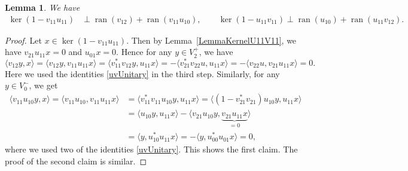 \documentclass[10pt,a4paper]{amsart}
\numberwithin{equation}{section}
\newtheorem{Lemma}[Theorem]{Lemma}
\DeclareMathOperator*{\ran}{ran}
\begin{document}
\begin{Lemma} \label{LemmaComplementOfRange}
 We have
 \begin{align*}
 \ker(1 - v_{11} u_{11}) &\perp \ran(v_{12}) + \ran(v_{11} u_{10}),\qquad \ker(1 - u_{11} v_{11}) \perp \ran (u_{10}) + \ran (u_{11} v_{12}).
 \end{align*}
\end{Lemma}

\begin{proof}
Let $x \in \ker(1-v_{11} u_{11})$. Then by Lemma~\ref{LemmaKernelU11V11}, we have $v_{21} u_{11} x = 0$ and $u_{01} x= 0$. Hence for any $y \in V_2^+$, we have
\begin{equation*}
 \langle v_{12} y, x \rangle = \langle v_{12} y, v_{11} u_{11} x \rangle = \langle v_{11}^* v_{12} y, u_{11} x \rangle = - \langle v_{21}^* v_{22} u, u_{11} x\rangle = -\langle v_{22} u, v_{21} u_{11} x\rangle = 0.
\end{equation*}
Here we used the identities \eqref{uvUnitary} in the third step. Similarly, for any $y \in V_0^-$, we get
\begin{align*}
 \langle v_{11} u_{10} y, x\rangle = \langle v_{11} u_{10}, v_{11} u_{11} x\rangle &= \langle v_{11}^* v_{11} u_{10} y, u_{11} x \rangle = \langle (1- v_{21}^* v_{21}) u_{10} y, u_{11} x\rangle \\
 &= \langle u_{10} y, u_{11} x \rangle - \langle v_{21} u_{10} y, \underbrace{v_{21} u_{11} x}_{=0} \rangle\\
 &= \langle y, u_{10}^*u_{11} x \rangle = -\langle y, u_{00}^*u_{01} x \rangle = 0,
\end{align*}
where we used two of the identities \eqref{uvUnitary}.
This shows the first claim.
The proof of the second claim is similar.
\end{proof}
\end{document}
